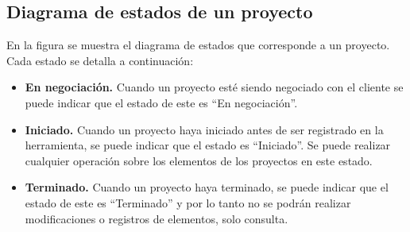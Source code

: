 \subsection{Diagrama de estados de un proyecto}

En la figura  se muestra el diagrama de estados que corresponde a un proyecto. Cada estado se
detalla a continuación:


\begin{itemize}
 \item {\bf En negociación.} Cuando un proyecto esté siendo negociado con el cliente se puede indicar 
 que el estado de este es ``En negociación''. 
 \item {\bf Iniciado.} Cuando un proyecto haya iniciado antes de ser registrado en la herramienta, se puede indicar que el estado es ``Iniciado''.
 Se puede realizar cualquier operación sobre los elementos de los proyectos en este estado.
 \item {\bf Terminado.} Cuando un proyecto haya terminado, se puede indicar que el estado de este es ``Terminado'' y por lo tanto no se podrán realizar
 modificaciones o registros de elementos, solo consulta.
\end{itemize}